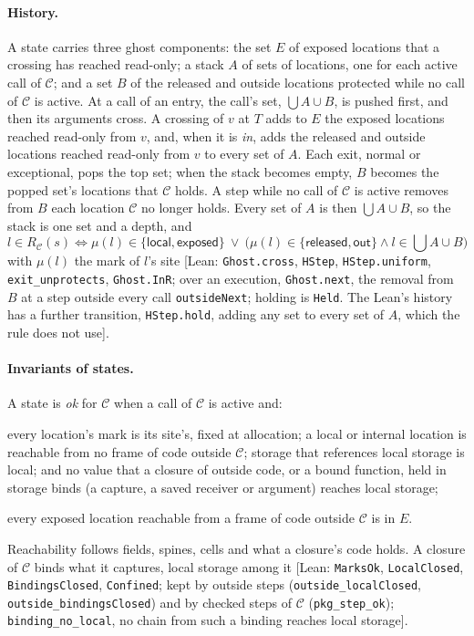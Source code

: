 \documentclass[10pt,a4paper]{article}
\theoremstyle{definition}
\theoremstyle{remark}
\newcommand{\kw}[1]{\mathsf{#1}}
\newcommand{\lean}[1]{\texttt{\small #1}}
\newcommand{\status}[1]{\textsf{\small[#1]}}
\newcommand{\cC}{\mathcal{C}}
\begin{document}
\paragraph{History.} A state carries three ghost components: the set $E$
of exposed locations that a crossing has reached read-only; a stack
$A$ of sets of locations, one for each active call of $\cC$; and a set $B$
of the released and outside locations protected while no call of $\cC$ is
active. At a call of an entry, the call's set, $\bigcup A\cup B$, is pushed
first, and then its arguments cross. A crossing of $v$ at $T$ adds to $E$
the exposed locations reached read-only from $v$, and, when it is
\emph{in}, adds the released and outside locations reached read-only
from $v$ to every set of $A$. Each exit, normal or exceptional, pops the
top set; when the stack becomes empty, $B$ becomes the popped set's
locations that $\cC$ holds. A step while no call of $\cC$ is active
removes from $B$ each location $\cC$ no longer holds. Every set of $A$
is then $\bigcup A\cup B$, so the stack is one set and a depth, and
\[
l\in R_\cC(s)\iff\mu(l)\in\{\kw{local},\kw{exposed}\}\ \vee\ \bigl(\mu(l)\in\{\kw{released},\kw{out}\}\wedge l\in{\textstyle\bigcup}A\cup B\bigr)
\]
with $\mu(l)$ the mark of $l$'s site
\status{Lean: \lean{Ghost.cross}, \lean{HStep}, \lean{HStep.uniform}, \lean{exit\_unprotects}, \lean{Ghost.InR}; over an execution, \lean{Ghost.next}, the removal from $B$ at a step outside every call \lean{outsideNext}; holding is \lean{Held}. The Lean's history has a further transition, \lean{HStep.hold}, adding any set to every set of $A$, which the rule does not use}.

\paragraph{Invariants of states.} A state is \emph{ok} for $\cC$ when a
call of $\cC$ is active and:
\begin{description}[leftmargin=1.5em,style=nextline]
\item[(M) Marks] every location's mark is its site's, fixed at
allocation; a local or internal location is reachable from no frame of
code outside $\cC$; storage that references local storage is local; and
no value that a closure of outside code, or a bound function, held in
storage binds (a capture, a saved receiver or argument) reaches local
storage;
\item[(P2) Confinement] every exposed location reachable from a frame of
code outside $\cC$ is in $E$.
\end{description}
Reachability follows fields, spines, cells and what a closure's code
holds. A closure of $\cC$ binds what it captures, local storage among it
\status{Lean: \lean{MarksOk}, \lean{LocalClosed}, \lean{BindingsClosed}, \lean{Confined}; kept by outside steps (\lean{outside\_localClosed}, \lean{outside\_bindingsClosed}) and by checked steps of $\cC$ (\lean{pkg\_step\_ok}); \lean{binding\_no\_local}, no chain from such a binding reaches local storage}.
\end{document}
